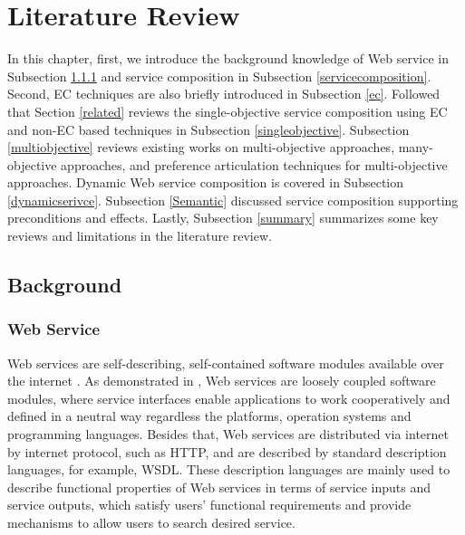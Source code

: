 \chapter{Literature Review}\label{C:review}
In this chapter, first, we introduce the background knowledge of Web service in Subsection \ref{service} and service composition in Subsection \ref{servicecomposition}. Second, EC techniques are also briefly introduced in Subsection \ref{ec}. Followed that Section \ref{related} reviews the single-objective service composition using EC and non-EC based techniques in Subsection \ref{singleobjective}.  Subsection  \ref{multiobjective} reviews existing works on multi-objective approaches, many-objective approaches, and preference articulation techniques for multi-objective approaches. Dynamic Web service composition is covered in Subsection \ref{dynamicserivce}. Subsection \ref{Semantic}  discussed service composition supporting preconditions and effects. Lastly, Subsection \ref{summary} summarizes some key reviews and limitations in the literature review.
\section{Background}\label{background}
\subsection{Web Service}\label{service}

Web services are self-describing, self-contained software modules available over the internet \cite{erl2004service}. As demonstrated in \cite{erl2004service}, Web services are loosely coupled software modules, where service interfaces enable applications to work cooperatively and defined in a neutral way regardless the platforms, operation systems and programming languages. Besides that, Web services are distributed via internet by internet protocol, such as HTTP, and are described by standard description languages, for example, WSDL. These description languages are mainly used to describe functional properties of Web services in terms of service inputs and service outputs, which satisfy users' functional requirements and provide mechanisms to allow users to search desired service. 

